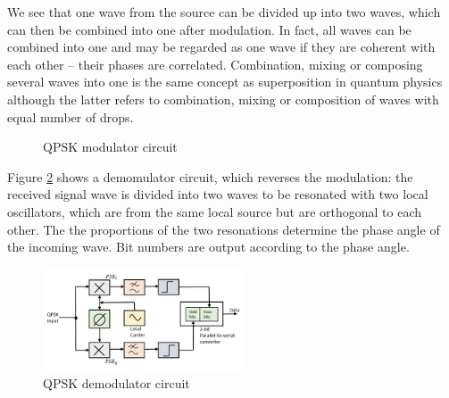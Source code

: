 \documentclass{book}
\begin{document}
We see that one wave from the source can be divided up into two waves, which can then be combined into one after modulation. In fact, all waves can be combined into one and may be regarded as one wave if they are coherent with each other -- their phases are correlated. Combination, mixing or composing several waves into one is the same concept as superposition in quantum physics although the latter refers to combination, mixing or composition of waves with equal number of drops.

\begin{figure}[ht]
\caption{QPSK modulator circuit}
\label{modulator}
\end{figure}

Figure \ref{deodulator} shows a demomulator circuit, which reverses the modulation: the received signal wave is divided into two waves to be resonated with two local oscillators, which are from the same local source but are orthogonal to each other. The the proportions of the two resonations determine the phase angle of the incoming wave. Bit numbers are output according to the phase angle.

\begin{figure}[ht]
\includegraphics[width=6cm]{pic/qpsk_demodulator.jpg}
\caption{QPSK demodulator circuit}
\label{deodulator}
\end{figure}
\end{document}
